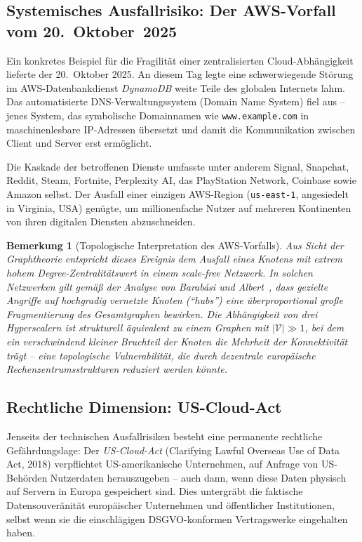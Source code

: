 \documentclass[12pt, a4paper, openany]{report}
\newtheorem{remark}[theorem]{Bemerkung}
\newcommand{\calV}{\mathcal{V}}
\begin{document}
\subsection{Systemisches Ausfallrisiko: Der AWS-Vorfall vom 20.~Oktober~2025}

Ein konkretes Beispiel für die Fragilität einer zentralisierten Cloud-Abhängigkeit
lieferte der 20.~Oktober 2025. An diesem Tag legte eine schwerwiegende Störung
im AWS-Datenbankdienst \textit{DynamoDB} weite Teile des globalen Internets
lahm. Das automatisierte DNS-Verwaltungssystem (Domain Name System) fiel aus --
jenes System, das symbolische Domainnamen wie \texttt{www.example.com} in
maschinenlesbare IP-Adressen übersetzt und damit die Kommunikation zwischen
Client und Server erst ermöglicht.

Die Kaskade der betroffenen Dienste umfasste unter anderem Signal, Snapchat,
Reddit, Steam, Fortnite, Perplexity AI, das PlayStation Network, Coinbase sowie
Amazon selbst. Der Ausfall einer einzigen AWS-Region (\texttt{us-east-1},
angesiedelt in Virginia, USA) genügte, um millionenfache Nutzer auf mehreren
Kontinenten von ihren digitalen Diensten abzuschneiden.

\begin{remark}[Topologische Interpretation des AWS-Vorfalls]
	\label{rem:aws_topologie}
	Aus Sicht der Graphtheorie entspricht dieses Ereignis dem Ausfall eines
	Knotens mit extrem hohem Degree-Zentralitätswert in einem scale-free
	Netzwerk. In solchen Netzwerken gilt gemäß der Analyse von Barabási und
	Albert~\cite{barabasi99}, dass gezielte Angriffe auf hochgradig vernetzte
	Knoten (``hubs'') eine überproportional große Fragmentierung des Gesamtgraphen
	bewirken. Die Abhängigkeit von drei Hyperscalern ist strukturell äquivalent
	zu einem Graphen mit $|\calV| \gg 1$, bei dem ein verschwindend kleiner
	Bruchteil der Knoten die Mehrheit der Konnektivität trägt -- eine
	topologische Vulnerabilität, die durch dezentrale europäische
	Rechenzentrumsstrukturen reduziert werden könnte.
\end{remark}

\subsection{Rechtliche Dimension: US-Cloud-Act}

Jenseits der technischen Ausfallrisiken besteht eine permanente rechtliche
Gefährdungslage: Der \emph{US-Cloud-Act} (Clarifying Lawful Overseas Use
of Data Act, 2018) verpflichtet US-amerikanische Unternehmen, auf Anfrage
von US-Behörden Nutzerdaten herauszugeben -- auch dann, wenn diese Daten
physisch auf Servern in Europa gespeichert sind. Dies untergräbt die
faktische Datensouveränität europäischer Unternehmen und öffentlicher
Institutionen, selbst wenn sie die einschlägigen DSGVO-konformen
Vertragswerke eingehalten haben.
\end{document}
